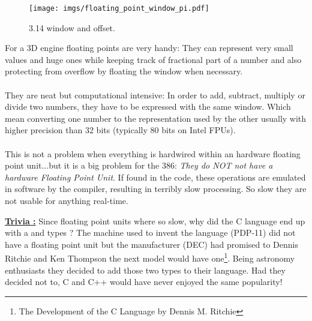 \documentclass[book.tex]{subfiles}
\begin{document}
\begin{figure}[H]
\centering
\texttt{[image: imgs/floating\_point\_window\_pi.pdf]}

\caption{3.14 window and offset.}
\label{fig:fp_internals}
\end{figure}
  \bigskip

For a 3D engine floating points are very handy: They can represent very small values and huge ones while keeping track of fractional part of a number and also protecting from overflow by floating the window when necessary.\\
\\
They are neat but computational intensive: In order to add, subtract, multiply or divide two numbers, they have to be expressed with the same window. Which mean converting one number to the representation used by the other usually with higher precision than 32 bits (typically 80 bits on Intel FPUs).\\
\\
This is not a problem when everything is hardwired within an hardware floating point unit...but it is a big problem for the 386: \emph{They do NOT not have a hardware Floating Point Unit}. If found in the code, these operations are emulated in software by the compiler, resulting in terribly slow processing. So slow they are not usable for anything real-time.\\ 
\par


 \textbf{\underline{Trivia :}} Since floating point units where so slow, why did the C language end up with a  and  types ? The machine used to invent the language (PDP-11) did not have a floating point unit but the manufacturer (DEC) had promised to Dennis Ritchie and Ken Thompson the next model would have one\footnote{The Development of the C Language by Dennis M. Ritchie}. Being astronomy enthusiasts they decided to add those two types to their language. Had they decided not to, C and C++ would have never enjoyed the same popularity!\\
\par
\end{document}
